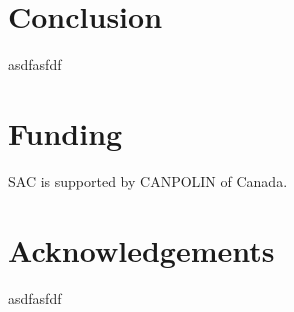 \documentclass[letterpaper,superscriptaddress,showkeys,longbibliography]{revtex4-1}
\begin{document}
\section{Conclusion}

asdfasfdf

\section{Funding}

SAC is supported by CANPOLIN of Canada. 

\section{Acknowledgements}

asdfasfdf

\newpage

\end{document}

